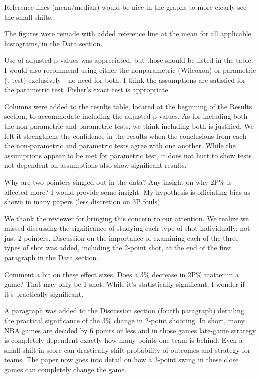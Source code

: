 \documentclass[12pt]{article}
\newenvironment{comment}%
{\begin{quoting}\noindent\small\it\ignorespaces%
  }{\end{quoting}}
\begin{document}
\begin{comment}
  Reference lines (mean/median) would be nice in the graphs to more clearly
  see the small shifts.
\end{comment}

The figures were remade with added reference line at the mean for all 
applicable histograms, in the Data section.
 
\begin{comment}
Use of adjusted p-values was appreciated, but those should be listed in 
the table.  I would also recommend using either the nonparametric (Wilcoxon)
or parametric (t-test) exclusively—no need for both.  I think the 
assumptions are satisfied for the parametric test.  Fisher’s exact test 
is appropriate
\end{comment}

 Columns were added to the results table, located at the beginning of the Results section,
 to accommodate including the adjusted p-values. As for including both the non-parametric
 and parametric tests, we think including both is justified. We felt it strengthens the 
 confidence in the results when the conclusions from each the non-parametric and parametric 
 tests agree with one another. While the assumptions appear to be met for parametric
 test, it does not hurt to show tests not dependent on assumptions also show
 significant results.
 
\begin{comment}
 Why are two pointers singled out in the data? Any insight on why 2P\% is 
 affected more? I would provide some insight. My hypothesis is officiating 
 bias as shown in many papers (less discretion on 3P fouls). 
\end{comment}

 We thank the reviewer for bringing this concern to our attention. We realize
 we missed discussing the significance of studying each type of shot individually,
 not just 2-pointers. Discussion on the importance of examining each of the three
 types of shot was added, including the 2-point shot, at the end of the first 
 paragraph in the Data section.

\begin{comment}
Comment a bit on these effect sizes. Does a 3\% decrease in 2P\% matter in a game?
That may only be 1 shot. While it's statistically significant, I wonder 
if it's practically significant.
\end{comment}

 A paragraph was added to the Discussion section (fourth paragraph) detailing the practical 
 significance of the 3\% change in 2-point shooting. In short, many NBA games 
 are decided by 6 points or less and in those games late-game strategy is 
 completely dependent exactly how many points one team is behind. Even a small
 shift in score can drastically shift probability of outcomes and strategy 
 for teams. The paper now goes into detail on how a 3-point swing in these 
 close games can completely change the game.
\end{document}
